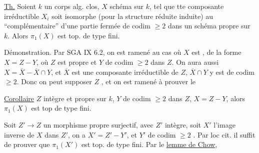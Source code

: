 \uline{Th.} Soient $k$ un corps alg. clos, $X$ schéma
 sur $k$,
tel que tte composante irréductible $X_i$ soit isomorphe
(pour la structure réduite induite) au
``complémentaire'' d'une partie fermée de codim $\geq2$ dans un schéma propre
sur $k$. Alors $\pi_1(X)$ est top. de type fini.


Démonstration. Par SGA IX 6.2, on est ramené au cas où
$X$ est ,
 de la forme $X=Z-Y$, où $Z$ est propre et $Y$ de
codim $\geq2$ dans $Z$.
On aura aussi $X=\overline X-\overline X\cap Y$,
et $\overline X$ est une composante irréductible de $Z$,
$\overline X\cap Y$ y est de codim $\geq2$.
Donc on peut supposer $Z$
,
et on est ramené à prouver le

\uline{Corollaire} $Z$ intègre et propre sur $k$, $Y$ de
codim $\geq2$ dans $Z$, $X=Z-Y$,
alors $\pi_1(X)$ est top de type fini.

Soit $Z'\to Z$ un morphisme propre surjectif, avec $Z'$ intègre,
soit $X'$ l'image inverse de $X$ dans $Z'$,
on a $X'=Z'-Y'$, et $Y'$ de codim $\geq2$
.
Par loc cit. il suffit de prouver que $\pi_1(X')$ est top.
de type fini. Par le \uline{lemme de Chow},
